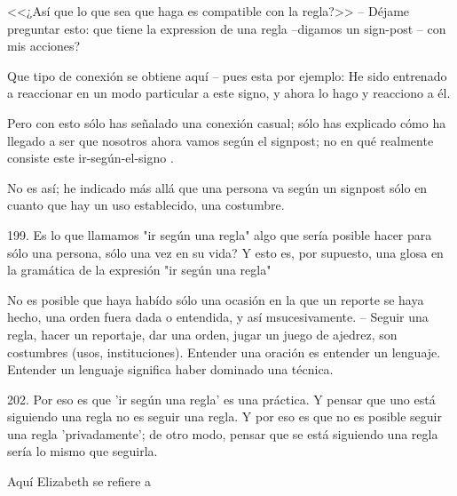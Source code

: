 <<¿Así que lo que sea que haga es compatible con la regla?>> -- Déjame preguntar
esto: que tiene la expression de una regla --digamos un sign-post -- con mis
acciones?

Que tipo de conexión se obtiene aquí -- pues esta por ejemplo: He sido entrenado
a reaccionar en un modo particular a este signo, y ahora lo hago y reacciono a
él.

Pero con esto sólo has señalado una conexión casual; sólo has explicado cómo ha
llegado a ser que nosotros ahora vamos según el signpost; no en qué realmente
consiste este ir-según-el-signo .

No es así; he indicado más allá que una persona va según un signpost sólo en
cuanto que hay un uso establecido, una costumbre.


199. Es lo que llamamos "ir según una regla" algo que sería posible hacer para
sólo una persona, sólo una vez en su vida? Y esto es, por supuesto, una glosa
en la gramática de la expresión "ir según una regla" 

No es posible que haya habído sólo una ocasión en la que un reporte se haya
hecho, una orden fuera dada o entendida, y así msucesivamente. -- Seguir una
regla, hacer un reportaje, dar una orden, jugar un juego de ajedrez, son
costumbres (usos, instituciones). Entender una oración es entender un lenguaje.
Entender un lenguaje significa haber dominado una técnica.


202. Por eso es que 'ir según una regla' es una práctica. Y pensar que uno
está siguiendo una regla no es seguir una regla. Y por eso es que no es
posible seguir una regla 'privadamente'; de otro modo, pensar que se está
siguiendo una regla sería lo mismo que seguirla.

Aquí Elizabeth se refiere a \autocite[p.~86~\S198]{PI}


